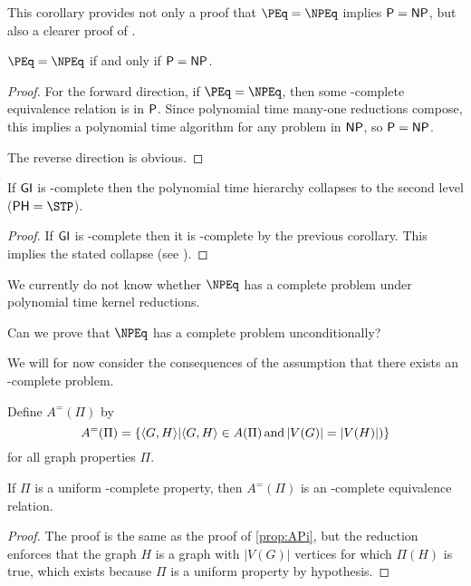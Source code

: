 This corollary provides not only a proof that $\PEq=\NPEq$ implies $\P=\NP$, but also a clearer proof of \cite[Proposition~8.1]{bcffm}.

\begin{corollary}
  $\PEq=\NPEq$ if and only if $\P=\NP$.
\end{corollary}
\begin{proof}
  For the forward direction, if $\PEq=\NPEq$, then some \NP-complete equivalence relation is in $\P$.
  Since polynomial time many-one reductions compose, this implies a polynomial time algorithm for any problem in $\NP$, so $\P=\NP$.

  The reverse direction is obvious.
\end{proof}

\begin{proposition}
  If $\GI$ is \NPEq-complete then the polynomial time hierarchy collapses to the second level ($\PH=\STP$).
\end{proposition}
\begin{proof}
  If $\GI$ is \NPEq-complete then it is \NP-complete by the previous corollary.
  This implies the stated collapse (see \cite{schoning87}).
\end{proof}

We currently do not know whether $\NPEq$ has a complete problem under polynomial time kernel reductions.
\begin{openproblem}
  Can we prove that $\NPEq$ has a complete problem unconditionally?
\end{openproblem}

We will for now consider the consequences of the assumption that there exists an \NPEq-complete problem.

Define $A^=(\Pi)$ by
\begin{displaymath}
  A^=(\Pi) = \{\pair{G}{H} | \pair{G}{H}\in A(\Pi) \plain{and} |V(G)|=|V(H)|)\}
\end{displaymath}
for all graph properties $\Pi$.

\begin{proposition}\label{prop:APieq}
  If $\Pi$ is a uniform \NP-complete property, then $A^=(\Pi)$ is an \NP-complete equivalence relation.
\end{proposition}
\begin{proof}
  The proof is the same as the proof of \autoref{prop:APi}, but the reduction enforces that the graph $H$ is a graph with $|V(G)|$ vertices for which $\Pi(H)$ is true, which exists because $\Pi$ is a uniform property by hypothesis.
\end{proof}

